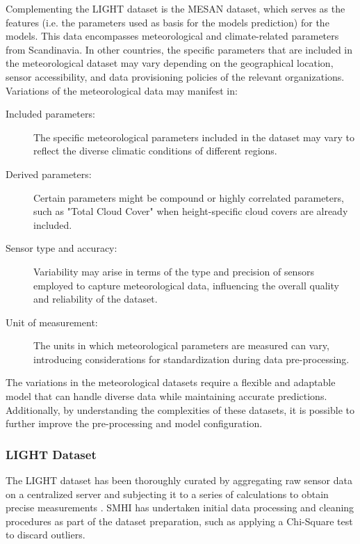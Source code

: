 Complementing the LIGHT dataset is the MESAN dataset, which serves as the features (i.e. the parameters used as basis for the models prediction) for the models. This data encompasses meteorological and climate-related parameters from Scandinavia. In other countries, the specific parameters that are included in the meteorological dataset may vary depending on the geographical location, sensor accessibility, and data provisioning policies of the relevant organizations. Variations of the meteorological data may manifest in:

\begin{description}
	\item[Included parameters:] The specific meteorological parameters included in the dataset may vary to reflect the diverse climatic conditions of different regions.
	\item[Derived parameters:] Certain parameters might be compound or highly correlated parameters, such as "Total Cloud Cover" when height-specific cloud covers are already included.
	\item[Sensor type and accuracy:] Variability may arise in terms of the type and precision of sensors employed to capture meteorological data, influencing the overall quality and reliability of the dataset.
	\item[Unit of measurement:] The units in which meteorological parameters are measured can vary, introducing considerations for standardization during data pre-processing.
\end{description}

The variations in the meteorological datasets require a flexible and adaptable model that can handle diverse data while maintaining accurate predictions. Additionally, by understanding the complexities of these datasets, it is possible to further improve the pre-processing and model configuration.

\subsubsection{LIGHT Dataset}
\label{sec:overview-light}

The LIGHT dataset has been thoroughly curated by aggregating raw sensor data on a centralized server and subjecting it to a series of calculations to obtain precise measurements \cite{data-light}. SMHI has undertaken initial data processing and cleaning procedures as part of the dataset preparation, such as applying a Chi-Square test \cite{chisquare} to discard outliers.

